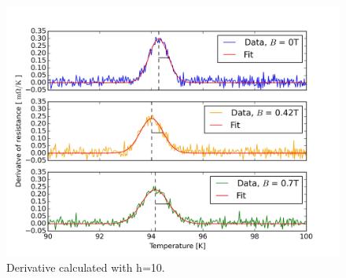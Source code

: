 \documentclass[a4paper,parskip,11pt, DIV12]{scrreprt}
\begin{document}
\begin{figure}[H]
\centering
\includegraphics[scale=0.11]{Criticaltemperature2}
\caption[]{Derivative calculated with h=10.}
\end{figure}
\end{document}
